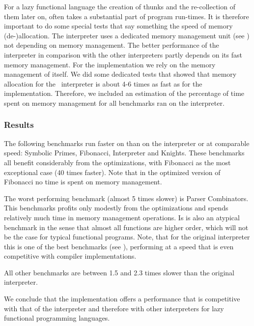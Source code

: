 For a lazy functional language the creation of thunks and the re-collection of them later on, often takes a substantial part of program run-times.
It is therefore important to do some special tests that say something the speed of memory (de-)allocation.
The \Sapl interpreter uses a dedicated memory management unit (see \cite{JKP}) not depending on \Java memory management. 
The better performance of the \Sapl interpreter in comparison with the other interpreters partly depends on its fast memory management.
For the \JS implementation we rely on  the memory management of \JS itself.
We did some dedicated tests that showed that memory allocation for the \Java\ \Sapl interpreter is about 4-6 times as fast as for the \JS implementation.
Therefore, we included an estimation of the percentage of time spent on memory management for all benchmarks ran on  the \Sapljs interpreter.

\subsubsection{Results}
The following benchmarks run faster on \Sapljs than on the \Sapl interpreter or at comparable speed: \textsf{Symbolic Primes}, \textsf{Fibonacci}, \textsf{Interpreter} and \textsf{Knights}. These benchmarks all benefit considerably from the optimizations, with \textsf{Fibonacci} as the most exceptional case (40 times faster).
Note that in the optimized version of \textsf{Fibonacci} no time is spent on memory management.

The worst performing benchmark (almost 5 times slower) is \textsf{Parser Combinators}. 
This benchmarks profits only modestly  from the optimizations and spends relatively much time 
in memory management operations. Is is also an atypical benchmark in the sense that almost all functions are higher order, which will not be the case for
typical functional programs. Note, that for the original \Sapl interpreter this is one of the best benchmarks (see \cite{JKP}), 
performing at a speed that is even competitive with compiler implementations. 

All other benchmarks are between 1.5 and 2.3 times slower than the original \Sapl interpreter.

We conclude that  the \Sapljs implementation offers a performance that is competitive with that of the \Sapl interpreter and therefore
with other interpreters for lazy functional programming languages.


